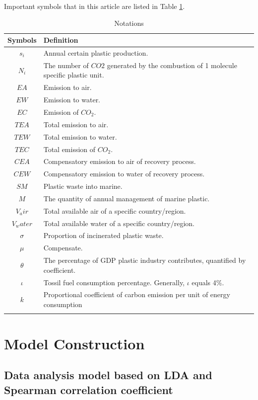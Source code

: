 \documentclass{mcmthesis}
\begin{document}
Important symbols that in this article are listed in Table \ref{notation}.
\begin{table}[H] 
	\caption{Notations} 
	\center
	\begin{tabular}{cp{}}
		\toprule 
		Symbols &Definition  \\ 
		\midrule 
		$s_i $& Annual certain plastic production.  \\ 
		$N_i$ & The number of $CO2$ generated by the combustion of 1 molecule specific plastic unit. \\ 
		$EA$ & Emission to air. \\ 
		$EW$ & Emission to water.\\
		$EC$ & Emission of $CO_2$.\\
		$TEA$ & Total emission to air.\\
		$TEW$ & Total emission to water.\\
		$TEC$ & Total emission of $CO_2$.\\
		$CEA$ & Compensatory emission to air of recovery process.\\
		$CEW$ & Compensatory emission to water of recovery process.\\
		$SM$ & Plastic waste into marine.\\
		$M$ & The quantity of annual management of marine plastic.\\
		$V_air$ & Total available air of a specific country/region.\\
		$V_water$ & Total available water of a specific country/region.\\
		$\sigma$ & Proportion of incinerated plastic waste.\\
		$\mu$ & Compensate.\\
		$\theta$ & The percentage of GDP plastic industry contributes, quantified by coefficient.\\
		$\iota$ & Tossil fuel consumption percentage. Generally, $\iota$ equals 4\%.\\
		$k$ & Proportional coefficient of carbon emission per unit of
energy consumption\\
		\bottomrule 
		\label{notation}
	\end{tabular} 
\end{table}

\section{Model Construction}
\subsection{Data analysis model based on LDA and Spearman correlation coefficient}
\end{document}
